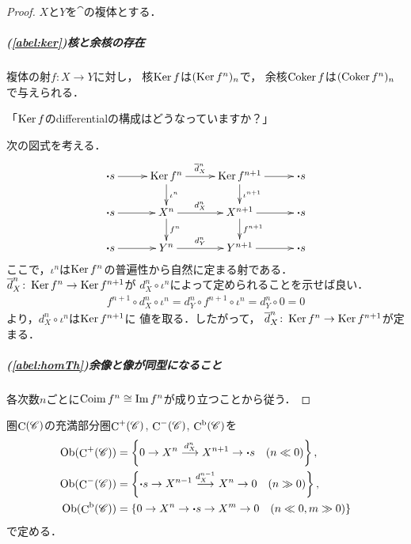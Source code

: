 \begin{proof}$X$と$Y$を$\cat$の複体とする．
    \subparagraph*{(\ref{abel:ker})核と余核の存在}
    複体の射$f\colon X\to Y$に対し，
    核$\mathop{\mathrm{Ker}}\nolimits{f}$は$(\mathop{\mathrm{Ker}}\nolimits{f^n})_n$で，
    余核$\mathop{\mathrm{Coker}}\nolimits{f}$は$(\mathop{\mathrm{Coker}}\nolimits{f^n})_n$で与えられる．
    \begin{com*}[4/24]
        「$\mathop{\mathrm{Ker}}\nolimits{f}$のdifferentialの構成はどうなっていますか？」

        次の図式を考える．
        \begin{equation*}
            \vcenter{\xymatrix@C=26pt@R=18pt{
            \boldsymbol{\cdot}s \ar[r]
            & 
            \Ker{f^{n}}
            \ar[r]^-{\overline{d}_X^n}
            \ar[d]^-{\iota^n}
            &
            \Ker{f^{n+1}}
            \ar[r]
            \ar[d]^-{\iota^{n+1}} 
            &\boldsymbol{\cdot}s
            \\    
            \boldsymbol{\cdot}s \ar[r]
            & 
            X^{n}
            \ar[r]^-{d_X^n}
            \ar[d]^-{f^n}
            &
            X^{n+1}
            \ar[r]
            \ar[d]^-{f^{n+1}} 
            &\boldsymbol{\cdot}s
            \\
            \boldsymbol{\cdot}s \ar[r]
            & 
            Y^{n}
            \ar[r]^-{d_Y^n}
            &
            Y^{n+1}
            \ar[r]
            &\boldsymbol{\cdot}s
            }}
        \end{equation*}
        ここで，$\iota^n$は$\mathop{\mathrm{Ker}}\nolimits{f^n}$の普遍性から自然に定まる射である．
        $\overline{d}_X^n\colon\mathop{\mathrm{Ker}}\nolimits{f^n}\to\mathop{\mathrm{Ker}}\nolimits{f^{n+1}}$が
        $d_X^n\circ\iota^n$によって定められることを示せば良い．
        \begin{align*}
            f^{n+1}\circ d_X^n\circ\iota^n
            =d_Y^n\circ f^{n+1}\circ\iota^n
            =d_Y^n\circ0=0
        \end{align*}
        より，$d_X^n\circ\iota^n$は$\mathop{\mathrm{Ker}}\nolimits{f^{n+1}}$に
        値を取る．したがって，
        $\overline{d}_X^n\colon\mathop{\mathrm{Ker}}\nolimits{f^n}\to\mathop{\mathrm{Ker}}\nolimits{f^{n+1}}$が定まる．
    \end{com*}

    \subparagraph*{(\ref{abel:homTh})余像と像が同型になること}
    各次数$n$ごとに$\mathop{\mathrm{Coim}}\nolimits f^n\cong \mathop{\mathrm{Im}}\nolimits f^n$が成り立つことから従う．
\end{proof}
圏$\mathop{\mathrm{C}}\nolimits(\mathscr{C})$の充満部分圏$\mathop{\mathrm{C}}\nolimits^+(\mathscr{C})$, 
$\mathop{\mathrm{C}}\nolimits^-(\mathscr{C})$, $\mathop{\mathrm{C}}\nolimits^\mathrm{b}(\mathscr{C})$を
\begin{align*}
    \mathop{\textrm{Ob}}\nolimits(\mathop{\mathrm{C}}\nolimits^+(\mathscr{C}))
    &=\left\{
        0\rightarrow
        X^{n}\overset{d_X^{n}}{\longrightarrow}
        X^{n+1}\rightarrow\boldsymbol{\cdot}s
        \quad (n\ll 0)
    \right\}, \\
    \mathop{\textrm{Ob}}\nolimits(\mathop{\mathrm{C}}\nolimits^-(\mathscr{C}))
    &=\left\{
        \boldsymbol{\cdot}s\rightarrow 
        X^{n-1}\overset{d_X^{n-1}}{\longrightarrow}
        X^{n}\rightarrow
        0
        \quad (n\gg 0)
    \right\}, \\
    \mathop{\textrm{Ob}}\nolimits(\mathop{\mathrm{C}}\nolimits^\mathrm{b}(\mathscr{C}))
    &=\left\{ 
        0\rightarrow
        X^{n}\rightarrow
        \boldsymbol{\cdot}s\rightarrow 
        X^{m}\rightarrow
        0
        \quad (n\ll 0, m\gg0)
    \right\}
\end{align*}
で定める．


